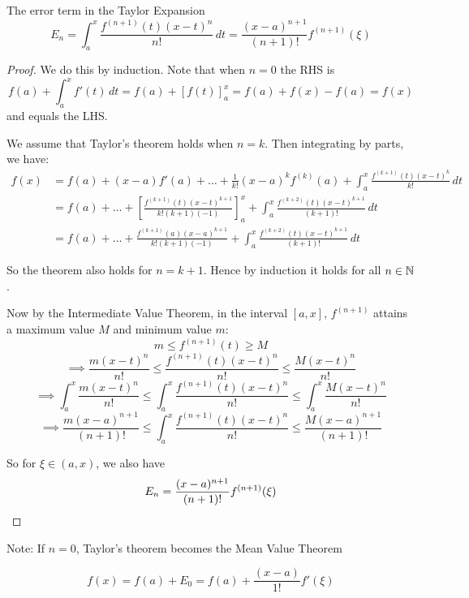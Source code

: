\documentclass[10pt]{scrartcl}
\begin{document}
\begin{theorem}
	The error term in the Taylor Expansion
	\[E_n = \int_a^x \frac{f^{(n+1)}(t)(x-t)^n}{n!}\,dt = \frac{(x-a)^{n+1}}{(n+1)!}f^{(n+1)}(\xi)\]
\end{theorem}

\begin{proof}
We do this by induction. Note that when $n=0$ the RHS is 
\[f(a) + \int_a^x f'(t)\,dt = f(a) + \left[f(t)\right]_a^x = f(a) + f(x) - f(a) = f(x)\]
and equals the LHS.

We assume that Taylor's theorem holds when $n =k$. Then integrating by parts, we have:
\[
\begin{aligned}
  f(x) &= f(a) + (x-a)f'(a) + \dots + \frac{1}{k!}(x-a)^kf^{(k)}(a) + \int_a^x \frac{f^{(k+1)}(t)(x-t)^k}{k!}\,dt\\[0.3cm]
  &= f(a) + \dots + \left[\frac{f^{(k+1)}(t)(x-t)^{k+1}}{k!(k+1)(-1)}\right]_a^x +  \int_a^x \frac{f^{(k+2)}(t)(x-t)^{k+1}}{(k+1)!}\,dt\\[0.3cm]
    &= f(a) + \dots + \frac{f^{(k+1)}(a)(x-a)^{k+1}}{k!(k+1)(-1)} + \int_a^x \frac{f^{(k+2)}(t)(x-t)^{k+1}}{(k+1)!}\,dt
\end{aligned}
\]

So the theorem also holds for $n = k+1$. Hence by induction it holds for all $n \in\mathbb{N}$. 

Now by the Intermediate Value Theorem, in the interval $[a,x]$, $f^{(n+1)}$ attains a maximum value $M$ and minimum value $m$:
\[m \leq f^{(n+1)}(t) \geq M\]\vspace*{5pt}
\[  \implies \frac{m(x-t)^n}{n!} \leq \frac{f^{(n+1)}(t)(x-t)^n}{n!} \leq \frac{M(x-t)^n}{n!}\]\vspace*{5pt}
\[\implies \int_a^x\frac{m(x-t)^n}{n!} \leq \int_a^x\frac{f^{(n+1)}(t)(x-t)^n}{n!} \leq \int_a^x \frac{M(x-t)^n}{n!}\]\vspace*{5pt}
\[\implies \frac{m(x-a)^{n+1}}{(n+1)!} \leq \int_a^x\frac{f^{(n+1)}(t)(x-t)^n}{n!} \leq \frac{M(x-a)^{n+1}}{(n+1)!}\]

So for $\xi \in (a,x)$, we also have \[E_n = \frac{(x-a)^{n+1}}{(n+1)!}f^{(n+1)}(\xi)\qedhere\]
\end{proof}


Note: If $n = 0$, Taylor's theorem becomes the Mean Value Theorem

\[f(x) = f(a) + E_0 = f(a) + \frac{(x-a)}{1!}f'(\xi)\]\vspace*{5pt}
\end{document}
